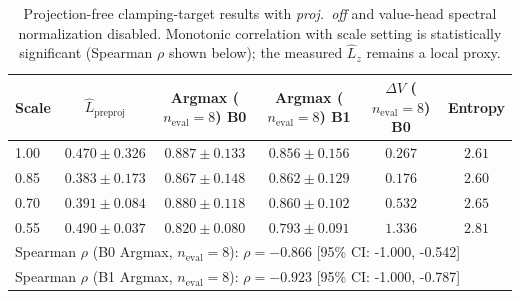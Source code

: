 \begin{table}[t]
\centering
\scriptsize
\caption{Projection-free clamping-target results with \emph{proj.\ off} and value-head spectral normalization disabled. Monotonic correlation with scale setting is statistically significant (Spearman $\rho$ shown below); the measured $\hat L_z$ remains a local proxy.}
\label{tab:exp4_projection_free_dial_v2}
\begin{tabular}{lccccc}
\toprule
Scale & $\hat{L}_{\text{preproj}}$ & Argmax ($n_{\mathrm{eval}}{=}8$) B0 & Argmax ($n_{\mathrm{eval}}{=}8$) B1 & $\Delta V$ ($n_{\mathrm{eval}}{=}8$) B0 & Entropy \\
\midrule
1.00 & $0.470 \pm 0.326$ & $0.887 \pm 0.133$ & $0.856 \pm 0.156$ & $0.267$ & $2.61$ \\
0.85 & $0.383 \pm 0.173$ & $0.867 \pm 0.148$ & $0.862 \pm 0.129$ & $0.176$ & $2.60$ \\
0.70 & $0.391 \pm 0.084$ & $0.880 \pm 0.118$ & $0.860 \pm 0.102$ & $0.532$ & $2.65$ \\
0.55 & $0.490 \pm 0.037$ & $0.820 \pm 0.080$ & $0.793 \pm 0.091$ & $1.336$ & $2.81$ \\
\midrule
\multicolumn{6}{l}{\small Spearman $\rho$ (B0 Argmax, $n_{\mathrm{eval}}{=}8$): $\rho=-0.866$ [95\% CI: -1.000, -0.542]} \\
\multicolumn{6}{l}{\small Spearman $\rho$ (B1 Argmax, $n_{\mathrm{eval}}{=}8$): $\rho=-0.923$ [95\% CI: -1.000, -0.787]} \\
\bottomrule
\end{tabular}
\end{table}
